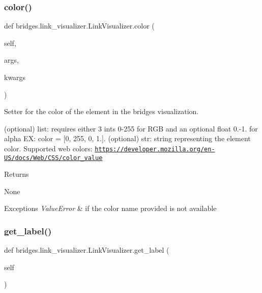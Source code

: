 \subsubsection{\texorpdfstring{color()}{color()}\hspace{0.1cm}{\footnotesize\ttfamily [2/2]}}
{\footnotesize\ttfamily def bridges.\+link\+\_\+visualizer.\+Link\+Visualizer.\+color (\begin{DoxyParamCaption}\item[{}]{self,  }\item[{}]{args,  }\item[{}]{kwargs }\end{DoxyParamCaption})}



Setter for the color of the element in the bridges visualization. 

(optional) list\+: requires either 3 ints 0-\/255 for R\+GB and an optional float 0.-\/1. for alpha EX\+: color = \mbox{[}0, 255, 0, 1.\mbox{]}. (optional) str\+: string representing the element color. Supported web colors\+: \href{https://developer.mozilla.org/en-US/docs/Web/CSS/color_value}{\tt https\+://developer.\+mozilla.\+org/en-\/\+U\+S/docs/\+Web/\+C\+S\+S/color\+\_\+value} \begin{DoxyReturn}{Returns}


None
\end{DoxyReturn}

\begin{DoxyExceptions}{Exceptions}
{\em Value\+Error} & if the color name provided is not available \\
\hline
\end{DoxyExceptions}
\mbox{\label{classbridges_1_1link__visualizer_1_1_link_visualizer_a36268a1bc712fb42f4401846e70536e6}} 
\subsubsection{\texorpdfstring{get\+\_\+label()}{get\_label()}}
{\footnotesize\ttfamily def bridges.\+link\+\_\+visualizer.\+Link\+Visualizer.\+get\+\_\+label (\begin{DoxyParamCaption}\item[{}]{self }\end{DoxyParamCaption})}



